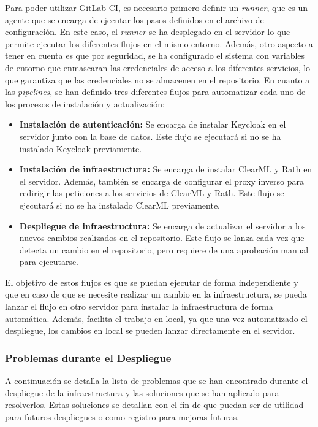 Para poder utilizar GitLab CI, es necesario primero definir un \textit{runner}, que
es un agente que se encarga de ejecutar los pasos definidos en el archivo
de configuración. En este caso, el \textit{runner} se ha desplegado en el servidor
lo que permite ejecutar los diferentes flujos en el mismo entorno. Además,
otro aspecto a tener en cuenta es que por seguridad, se ha configurado el
sistema con variables de entorno que enmascaran las credenciales de acceso
a los diferentes servicios, lo que garantiza que las credenciales no se
almacenen en el repositorio. En cuanto a las \textit{pipelines}, se han definido 
tres diferentes flujos para automatizar cada uno de los procesos de 
instalación y actualización:

\begin{itemize}
    \item \textbf{Instalación de autenticación:} Se encarga de instalar Keycloak
    en el servidor junto con la base de datos. Este flujo se ejecutará si no
    se ha instalado Keycloak previamente.
    \item \textbf{Instalación de infraestructura:} Se encarga de instalar ClearML y Rath
    en el servidor. Además, también se encarga de configurar el proxy inverso
    para redirigir las peticiones a los servicios de ClearML y Rath. Este flujo
    se ejecutará si no se ha instalado ClearML previamente.
    \item \textbf{Despliegue de infraestructura:} Se encarga de actualizar el
    servidor a los nuevos cambios realizados en el repositorio. Este flujo se
    lanza cada vez que detecta un cambio en el repositorio, pero requiere de
    una aprobación manual para ejecutarse.
\end{itemize}

El objetivo de estos flujos es que se puedan ejecutar de forma independiente
y que en caso de que se necesite realizar un cambio en la infraestructura,
se pueda lanzar el flujo en otro servidor para instalar la infraestructura
de forma automática. Además, facilita el trabajo en local, ya que una vez
automatizado el despliegue, los cambios en local se pueden lanzar
directamente en el servidor.


\subsubsection{Problemas durante el Despliegue}
A continuación se detalla la lista de problemas que se han encontrado durante
el despliegue de la infraestructura y las soluciones que se han aplicado para
resolverlos. Estas soluciones se detallan con el fin de que puedan ser de utilidad
para futuros despliegues o como registro para mejoras futuras.


